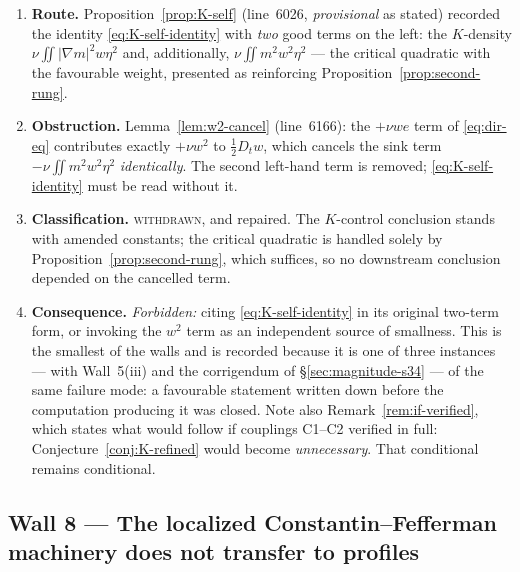 \documentclass[11pt]{article}
\theoremstyle{definition}
\theoremstyle{remark}
\begin{document}
\begin{enumerate}[label=(\alph*),leftmargin=2.2em]
  \item \textbf{Route.} Proposition~\ref{prop:K-self} (line~6026,
    \emph{provisional} as stated) recorded the identity
    \eqref{eq:K-self-identity} with \emph{two} good terms on the left: the
    $K$-density $\nu\iint|\nabla m|^2w\eta^2$ and, additionally,
    $\nu\iint m^2w^2\eta^2$ --- the critical quadratic with the favourable
    weight, presented as reinforcing
    Proposition~\ref{prop:second-rung}.
  \item \textbf{Obstruction.} Lemma~\ref{lem:w2-cancel} (line~6166): the
    $+\nu w\hat e$ term of \eqref{eq:dir-eq} contributes exactly $+\nu w^2$
    to $\tfrac12 D_tw$, which cancels the sink term
    $-\nu\iint m^2w^2\eta^2$ \emph{identically}. The second left-hand term is
    removed; \eqref{eq:K-self-identity} must be read without it.
  \item \textbf{Classification.} \textsc{withdrawn}, and repaired. The
    $K$-control conclusion stands with amended constants; the critical
    quadratic is handled solely by Proposition~\ref{prop:second-rung}, which
    suffices, so no downstream conclusion depended on the cancelled term.
  \item \textbf{Consequence.} \emph{Forbidden:} citing
    \eqref{eq:K-self-identity} in its original two-term form, or invoking the
    $w^2$ term as an independent source of smallness. This is the smallest of
    the walls and is recorded because it is one of three instances --- with
    Wall~5(iii) and the corrigendum of \S\ref{sec:magnitude-s34} --- of the
    same failure mode: a favourable statement written down before the
    computation producing it was closed.
    Note also Remark~\ref{rem:if-verified}, which states what would follow if
    couplings C1--C2 verified in full: Conjecture~\ref{conj:K-refined} would
    become \emph{unnecessary}. That conditional remains conditional.
\end{enumerate}

\subsection{Wall 8 --- The localized Constantin--Fefferman machinery does not
  transfer to profiles}
\label{subsec:wall8-cf-transfer}
\end{document}
